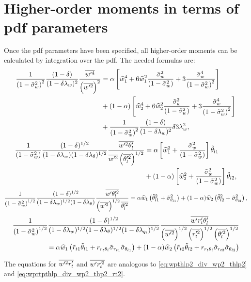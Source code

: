 \section{Higher-order moments in terms of pdf parameters}\label{sec:higher_order_moments}

Once the \gls{pdf} parameters have been specified, all higher-order moments can be calculated by integration over the \gls{pdf}.
The needed formulas are:
\begin{align}
    \label{eq:wp4_div_wp2_2}
    \frac{1}{\left( 1 - \tilde{\sigma}_w^2 \right)^2} \frac{(1-\delta)}{(1-\delta \lambda_w)^2} \frac{\overline{w'^4}}{\left(\overline{w'^2} \right)^2}
    &= \alpha \left[\widehat{w}_1^4 + 6 \widehat{w}_1^2 \frac{{\tilde{\sigma}_w}^2}{\left( 1 - \tilde{\sigma}_w^2 \right)} + 3 \frac{{\tilde{\sigma}_w}^4}{\left( 1 - \tilde{\sigma}_w^2 \right)^2} \right] \nonumber \\
    &+ (1 - \alpha) \left[\widehat{w}_2^4 + 6 \widehat{w}_2^2 \frac{{\tilde{\sigma}_w}^2}{\left( 1 - \tilde{\sigma}_w^2 \right)} + 3 \frac{{\tilde{\sigma}_w}^4}{\left( 1 - \tilde{\sigma}_w^2 \right)^2} \right] \nonumber \\
    &+ \frac{1}{\left( 1 - \tilde{\sigma}_w^2 \right)^2} \frac{(1-\delta)}{(1-\delta \lambda_w)^2} \delta 3 \lambda_w^2,
\end{align}
\begin{align}
    \label{eq:wp2thlp_div_wp2thl2}
    \frac{1}{\left( 1 - \tilde{\sigma}_w^2 \right)} \frac{(1-\delta)^{1/2}}{(1-\delta \lambda_w) (1-\delta \lambda_\theta)^{1/2}} \frac{\overline{w'^2 \theta_l'}}{\overline{w'^2} \left(\overline{\theta_l'^2} \right)^{1/2}}
    &= \alpha \left[\widehat{w}_1^2 + \frac{{\tilde{\sigma}_w}^2}{\left( 1 - \tilde{\sigma}_w^2 \right)} \right] \tilde{\theta}_{l1} \nonumber\\
    &+ (1-\alpha) \left[\widehat{w}_2^2 + \frac{{\tilde{\sigma}_w}^2}{\left( 1 - \tilde{\sigma}_w^2 \right)}\right] \tilde{\theta}_{l2},
\end{align}
\begin{align}
    \label{eq:wpthlp2_div_wp2_thlp2}
    \frac{1}{\left( 1 - \tilde{\sigma}_w^2 \right)^{1/2}} \frac{(1-\delta)^{1/2}}{(1-\delta \lambda_w)^{1/2} (1-\delta \lambda_\theta)} \frac{\overline{w' \theta_l'^2}}{\left(\overline{w'^2}\right)^{1/2}\overline{\theta_l'^2}}
    = \alpha  \widehat{w}_1  \left( \tilde{\theta}_{l1}^2 + \tilde{\sigma}_{\theta_{l1}}^2 \right)
    + (1-\alpha) \widehat{w}_2 \left( \tilde{\theta}_{l2}^2 + \tilde{\sigma}_{\theta_{l2}}^2 \right),
\end{align}
\begin{align}
    \label{eq:wprtpthlp_div_wp2_thp2_rt2}
    \frac{1}{\left( 1 - \tilde{\sigma}_w^2 \right)^{1/2}} \frac{(1-\delta)^{1/2}}{(1-\delta \lambda_w)^{1/2} (1-\delta \lambda_\theta)^{1/2}(1-\delta \lambda_{q_t})^{1/2}} \frac{\overline{w' r_t' \theta_l'}}{\left( \overline{w'^2} \right)^{1/2}\left(\overline{r_t'^2} \right)^{1/2} \left( \overline{\theta_l'^2} \right)^{1/2}} \nonumber \\
    = \alpha \widehat{w}_1 \left(\tilde{r}_{t1} \tilde{\theta}_{l1} + r_{r_t \theta_l} \tilde{\sigma}_{r_{t1}} \tilde{\sigma}_{\theta_{l1}} \right) + (1-\alpha) \widehat{w}_2 \left(\tilde{r}_{t2} \tilde{\theta}_{l2} + r_{r_t \theta_l} \tilde{\sigma}_{r_{t2}} \tilde{\sigma}_{\theta_{l2}} \right)
\end{align}

The equations for $\overline{w'^2 r_t'}$ and $\overline{w' r_t'^2}$ are analogous to \cref{eq:wpthlp2_div_wp2_thlp2} and \cref{eq:wprtpthlp_div_wp2_thp2_rt2}.